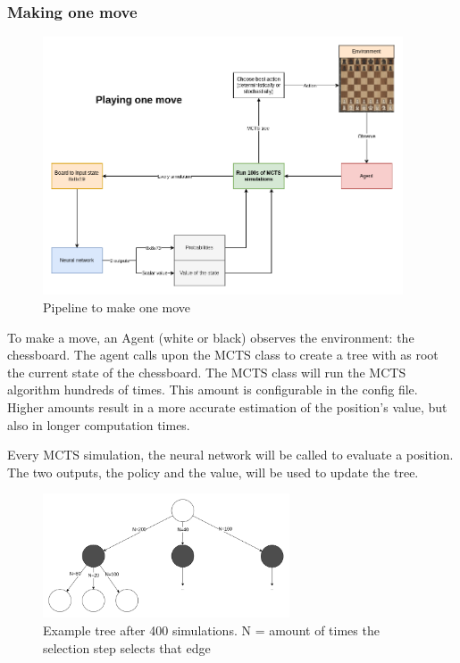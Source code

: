 \documentclass{article}
\begin{document}
\subsubsection{Making one move}

\begin{figure}[H]
    \centering
    \includegraphics[width=0.95\textwidth]{img/ChessRL-schematic.png}
    \caption{Pipeline to make one move}
\end{figure}

To make a move, an Agent (white or black) observes the environment: the chessboard.
The agent calls upon the MCTS class to create a tree with as root the current state of the chessboard.
The MCTS class will run the MCTS algorithm hundreds of times. This amount is configurable in the config file. 
Higher amounts result in a more accurate estimation of the position's value, but also in longer 
computation times.

Every MCTS simulation, the neural network will be called to evaluate a position. The two outputs, 
the policy and the value, will be used to update the tree. 

\begin{figure}[H]
    \centering
    \includegraphics[width=0.65\textwidth]{img/MCTS-choose-move.png}
    \caption{Example tree after 400 simulations. N = amount of times the selection step selects that edge}
\end{figure}
\end{document}
